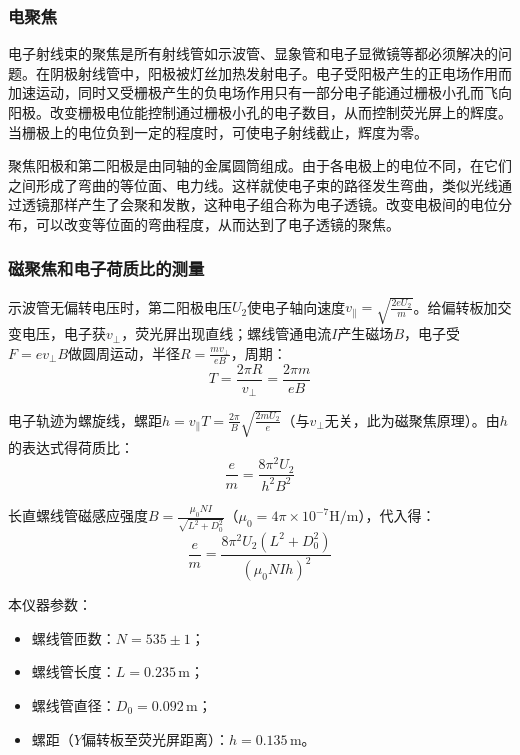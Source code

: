 \documentclass[11pt]{article}
\begin{document}
\subsubsection{电聚焦}
电子射线束的聚焦是所有射线管如示波管、显象管和电子显微镜等都必须解决的问题。在阴极射线管中，阳极被灯丝加热发射电子。电子受阳极产生的正电场作用而加速运动，同时又受栅极产生的负电场作用只有一部分电子能通过栅极小孔而飞向阳极。改变栅极电位能控制通过栅极小孔的电子数目，从而控制荧光屏上的辉度。当栅极上的电位负到一定的程度时，可使电子射线截止，辉度为零。 

聚焦阳极和第二阳极是由同轴的金属圆筒组成。由于各电极上的电位不同，在它们之间形成了弯曲的等位面、电力线。这样就使电子束的路径发生弯曲，类似光线通过透镜那样产生了会聚和发散，这种电子组合称为电子透镜。改变电极间的电位分布，可以改变等位面的弯曲程度，从而达到了电子透镜的聚焦。


\subsubsection{磁聚焦和电子荷质比的测量}
示波管无偏转电压时，第二阳极电压$U_2$使电子轴向速度$v_{\parallel} = \sqrt{\frac{2eU_2}{m}}$。给偏转板加交变电压，电子获$v_{\perp}$，荧光屏出现直线；螺线管通电流$I$产生磁场$B$，电子受$F = e v_{\perp} B$做圆周运动，半径$R = \frac{m v_{\perp}}{e B}$，周期：
\begin{equation}
    T = \frac{2\pi R}{v_{\perp}} = \frac{2\pi m}{e B}
\end{equation}

电子轨迹为螺旋线，螺距$h = v_{\parallel} T = \frac{2\pi}{B} \sqrt{\frac{2mU_2}{e}}$（与$v_{\perp}$无关，此为磁聚焦原理）。由$h$的表达式得荷质比：
\begin{equation}
    \frac{e}{m} = \frac{8\pi^2 U_2}{h^2 B^2}
\end{equation}

长直螺线管磁感应强度$B = \frac{\mu_0 N I}{\sqrt{L^2 + D_0^2}}$（$\mu_0 = 4\pi \times 10^{-7}\mathrm{H/m}$），代入得：
\begin{equation}
    \frac{e}{m} = \frac{8\pi^2 U_2 (L^2 + D_0^2)}{(\mu_0 N I h)^2}
  \end{equation}

本仪器参数：
\begin{itemize}
    \item 螺线管匝数：$N = 535 \pm 1$；
    \item 螺线管长度：$L = 0.235\,\mathrm{m}$；
    \item 螺线管直径：$D_0 = 0.092\,\mathrm{m}$；
    \item 螺距（$Y$偏转板至荧光屏距离）：$h = 0.135\,\mathrm{m}$。
\end{itemize}
\end{document}
